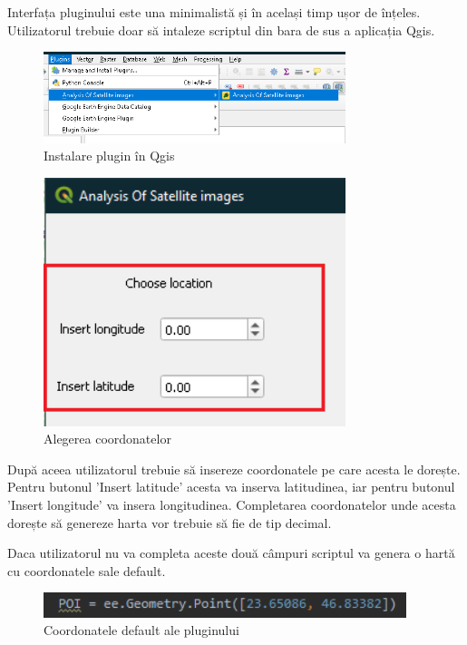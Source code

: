 \documentclass[12pt,a4paper]{article}
\theoremstyle{definition}
\theoremstyle{remark}
\begin{document}
Interfața pluginului este una minimalistă și în același timp ușor de înțeles. Utilizatorul trebuie doar să intaleze scriptul din bara de sus a aplicația Qgis.

\begin{figure}[H]
  \centering
  \includegraphics[width=250pt]{analiza.PNG}
  \caption{Instalare plugin în Qgis}   
\end{figure}



\begin{figure}[H]
  \centering
  \includegraphics[width=250pt]{location.PNG}
  \caption{Alegerea coordonatelor}   
\end{figure}

După aceea utilizatorul trebuie să insereze coordonatele pe care acesta le dorește. Pentru butonul 'Insert latitude' acesta va inserva latitudinea, iar pentru butonul 'Insert longitude' va insera longitudinea. Completarea coordonatelor unde acesta dorește să genereze harta vor trebuie să fie de tip decimal. 

Daca utilizatorul nu va completa aceste două câmpuri scriptul va genera o hartă cu coordonatele sale default.

\begin{figure}[H]
  \centering
  \includegraphics[width=300pt]{coordonate defalut.PNG}
  \caption{Coordonatele default ale pluginului}   
\end{figure}
\end{document}
